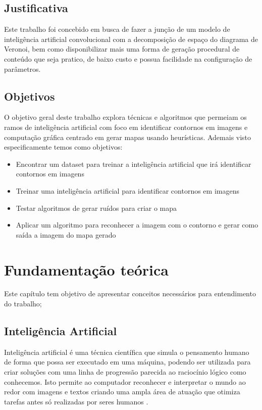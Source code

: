 \documentclass[
	12pt,				%
	openright,			%
	twoside,			%
	a4paper,			%
	english,			%
	french,				%
	spanish,			%
	brazil				%
	]{abntex2}
\begin{document}
\section{Justificativa}

Este trabalho foi concebido em busca de fazer a junção de um modelo de inteligência artificial convolucional com a decomposição de espaço do diagrama de Veronoi, bem como 
disponibilizar mais uma forma de geração procedural de conteúdo que seja pratico, de baixo custo e possua
facilidade na configuração de parâmetros.
\section{Objetivos}

O objetivo geral deste trabalho explora técnicas e algoritmos que permeiam os ramos de inteligência artificial com foco em identificar contornos em imagens e computação 
gráfica centrado em gerar mapas usando heurísticas.
Ademais visto especificamente temos como objetivos:

\begin{itemize}
	\item Encontrar um dataset para treinar a inteligência artificial que irá identificar contornos em imagens
	\item Treinar uma inteligência artificial para identificar contornos em imagens
	\item Testar algoritmos de gerar ruídos para criar o mapa
	\item Aplicar um algoritmo para reconhecer a imagem com o contorno e gerar como saída a imagem do mapa gerado
\end{itemize}


\chapter{Fundamentação teórica}
\label{sec:background}
	\label{sec:fund_teorica}

Este capítulo tem objetivo de apresentar conceitos necessários para entendimento do trabalho;

\section{Inteligência Artificial}
Inteligência artificial é uma técnica científica que simula o pensamento humano de forma que possa ser executado em uma máquina, podendo ser utilizada para criar soluções com uma linha de progressão parecida ao raciocínio lógico como conhecemos. Isto permite ao computador reconhecer e interpretar o mundo ao redor com imagens e textos criando uma ampla área de atuação que otimiza tarefas antes só realizadas por seres humanos \space\cite{ia_aliada_ou_inimiga}.
\end{document}
